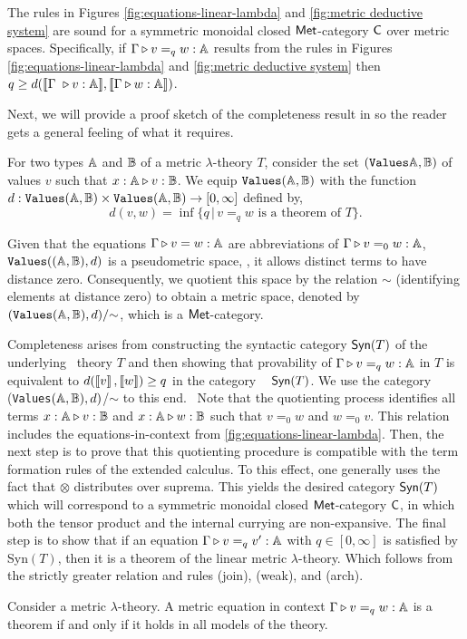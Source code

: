 \begin{theorem} [Soundness] \cite[Theorem 3.14]{dahlqvist2023syntactic}  \label{thm:soundness_metric_no_cond}
  The rules in Figures \ref{fig:equations-linear-lambda} and \ref{fig:metric deductive system} are sound for a  symmetric monoidal closed $\mathsf{Met}$-category  $\mathsf{C}$ over metric spaces. Specifically, if $\Gamma \triangleright v =_{q} w : \mathbb{A} $ results from the rules in Figures \ref{fig:equations-linear-lambda} and \ref{fig:metric deductive system} then $q \geq d( \llbracket \Gamma  \vljud v : \typeA \rrbracket, \llbracket\Gamma \vljud w : \typeA \rrbracket)$.
\end{theorem}


Next, we will provide a proof sketch of the completeness result in \cite{dahlqvist2023syntactic} so the reader gets a general feeling of what it requires.

For two types $\mathbb{A}$ and $\mathbb{B}$ of a metric $\lambda$-theory $T$, consider the set $(\texttt{Values}\mathbb{A},\mathbb{B})$ of values $v$ such that $x : \mathbb{A} \triangleright v : \mathbb{B}$. We equip $\texttt{Values}(\mathbb{A},\mathbb{B})$ with the function $d :\texttt{Values}(\mathbb{A},\mathbb{B}) \times \texttt{Values}(\mathbb{A},\mathbb{B}) \rightarrow [0, \infty]$ defined by,
$$d(v,w)=\inf{\{q \, \vert \, v=_q w \text{ is a theorem of } T \}}.$$


Given that the equations $\Gamma \triangleright v = w : \mathbb{A}$ are abbreviations of $\Gamma \triangleright v =_0 w : \mathbb{A}$, $\texttt{Values}((\mathbb{A},\mathbb{B}), d)$ is a pseudometric space, \ie, it allows distinct terms to have distance zero. Consequently, we quotient this space by the relation $\sim$ (identifying elements at distance zero) to obtain a metric space, denoted by $(\texttt{Values}(\mathbb{A}, \mathbb{B}), d)/{\sim}$, which is a $\mathsf{Met}$-category.

Completeness arises from constructing the syntactic category $\mathsf{Syn}(T)$ of the underlying  theory
$T$ and then showing that provability of $\Gamma \triangleright v =_q w : \mathbb{A}$
 in $T$ is equivalent to $d(\left \llbracket v \right \rrbracket,\left \llbracket w \right \rrbracket) \geq q$ in the category
  $\mathsf{Syn}(T)$. We use the category (\texttt{Values}$(\mathbb{A},\mathbb{B}),d)$/$\sim$ to this end.  Note that the quotienting process identifies all terms $x : \mathbb{A} \triangleright v : \mathbb{B}$ and $x : \mathbb{A} \triangleright w : \mathbb{B}$ such that $v =_0 w$ and $w =_0 v$. This relation includes the equations-in-context from \autoref{fig:equations-linear-lambda}. Then, the next step is to prove that this quotienting procedure is compatible with the term formation rules of the extended calculus. To this effect, one generally uses the fact that $\otimes$ distributes over suprema. This yields the desired category $\mathsf{Syn}(T)$ which will correspond to a symmetric monoidal closed $\mathsf{Met}$-category $\mathsf{C}$, in which both the tensor product and the internal currying are non-expansive. The final step is to show that if an equation $\Gamma \triangleright v =_q v' : \mathbb{A}$ with $q \in [0, \infty]$ is satisfied by Syn$(T)$, then it is a theorem of the linear metric $\lambda$-theory. Which follows from the strictly greater relation and rules (join), (weak), and (arch).




\begin{theorem}[Completeness] \cite[Theorem 3.16]{dahlqvist2023syntactic} \label{thm:completeness_metric_no_cond}
Consider a  metric $\lambda$-theory. A metric equation in context
$\Gamma \triangleright v =_{q} w : \mathbb{A}$
is a theorem if and only if it holds in all models of the theory.
\end{theorem}

